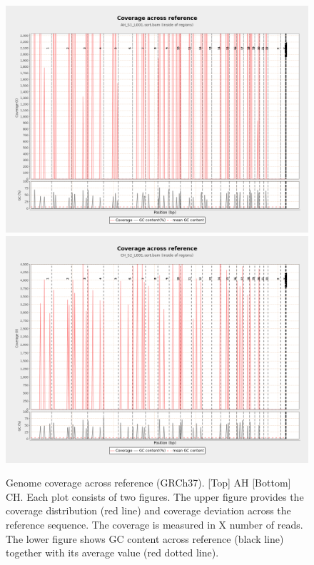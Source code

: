\documentclass{article}
\begin{document}
\begin{figure}[ht] \hspace*{0cm} 
\begin{center}
    \includegraphics[scale=0.3]{qualimap/AH_S1_L001.sort_stats/images_qualimapReport/genome_coverage_across_reference}
        \includegraphics[scale=0.3]{qualimap/CH_S2_L001.sort_stats/images_qualimapReport/genome_coverage_across_reference}
	\caption{
	Genome coverage across reference (GRCh37). [Top] AH [Bottom] CH.
	Each plot consists of two figures. The upper figure provides the coverage distribution (red line) and coverage deviation across the reference sequence. The coverage is measured in X number of reads. The lower figure shows GC content across reference (black line) together with its average value (red dotted line).
	}
	\label{fig:qualimap_gen_cov_ref}
\end{center}
\end{figure}
\end{document}
